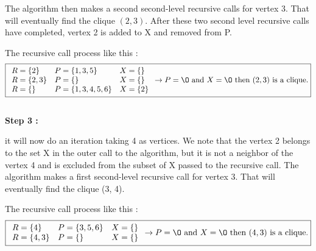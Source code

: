     \begin{minipage}{0.6\textwidth}
        The algorithm then makes a second second-level recursive calls for vertex 3. That will eventually find the clique $(2,3)$. After these two second level recursive calls have completed, vertex 2 is added to X and removed from P.
    \end{minipage}
    The recursive call process like this  :
    $$ \boxed{
        \begin{array}{lll}
            R = \{2\} & P = \{1,3,5\} & X = \{\} \\
            R = \{2,3\} & P = \{\} & X = \{\} \\
            R = \{\} & P = \{1,3,4,5,6\} & X = \{2\} \\
        \end{array} 
        \rightarrow P = \O \text{ and } X = \O \text{ then } (2,3) \text{ is a clique.}
    }$$
    \\
    \hspace*{1cm}  \textbf{Step 3 :}
    \\
    \begin{minipage}{0.4\textwidth}
    \end{minipage}
    \begin{minipage}{0.6\textwidth}
        it will now do an iteration taking 4 as vertices. We note that the vertex 2 belongs to the set X in the outer call to the algorithm, but it is not a neighbor of the vertex 4 and is excluded from the subset of X passed to the recursive call. The algorithm makes a first second-level recursive call for vertex 3. That will eventually find the clique (3, 4).
    \end{minipage}
    The recursive call process like this  :
    $$ \boxed{
        \begin{array}{lll}
            R = \{4\} & P = \{3,5,6\} & X = \{\} \\
            R = \{4,3\} & P = \{\} & X = \{\} \\
        \end{array} 
        \rightarrow P = \O \text{ and } X = \O \text{ then } (4,3) \text{ is a clique.}
    }$$
